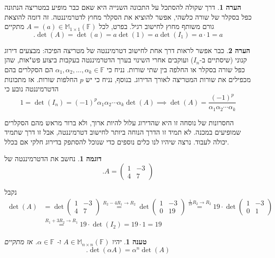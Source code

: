 \documentclass[12pt]{report}
\theoremstyle{plain}
\newtheorem{proposition}[theorem]{טענה}
\theoremstyle{definition}
\newtheorem{example}{דוגמה}[chapter]
\newtheorem{remark}{הערה}[chapter]
\newcommand{\F}{\mathbb{F}}
\newcommand{\M}{\mathbb{M}}
\newcommand{\0}{\mathbf{0}}
\begin{document}
\begin{remark}
דרך שקולה להסתכל על התכונה השנייה היא שאם כבר מופיע במטריצה הנתונה כפל בסקלר של שורה כלשהי,
אפשר להוציא את הסקלר מחוץ לדטרמיננטה. זה דומה להוצאת גורם משותף מחוץ לחישוב רגיל. בפרט, לכל
$A=(a)\in\M_{1\times 1}(\F)$
מתקיים
$$
.\det(A)=\det(a)=a\det(1)=a\det(I_1)=a\cdot1=a
$$
\end{remark}

\begin{remark}
כבר אפשר לראות דרך אחת לחישוב דטרמיננטה של מטריצה הפיכה: מבצעים דירוג קנוני (שיסתיים ב-$I_n$) ועוקבים אחרי השינוי בערך הדטרמיננטה בעקבות ביצוע פש"אות, שהן כפל שורה בסקלר או החלפה בין שתי שורות. נניח כי
$\alpha_1,\alpha_2,...,\alpha_k\in\F$
הם הסקלרים בהם מכפילים את שורות המטריצה לאורך הדירוג. בנוסף, נניח כי יש 
$p$
החלפות שורות. אז מתכונות הדטרמיננטה נובע כי
$$
1=\det(I_n)=(-1)^p\alpha_1\alpha_2\cdots\alpha_k\det(A) \implies \det(A)=\frac{(-1)^p}{\alpha_1\alpha_2\cdots\alpha_k}
$$

החסרונות של נוסחה זו היא שהדירוג עלול להיות ארוך, ולא ברור מראש מהם הסקלרים שמופיעים במכנה. לא תמיד זו הדרך הנוחה ביותר לחישוב דטרמיננטה, אבל זו דרך שתמיד יכולה לעבוד. נרצה שיהיו לנו כלים נוספים כדי שנוכל להסתפק בדירוג חלקי אם בכלל.

\end{remark}

\begin{example}
נחשב את הדטרמיננטה של
$$
.A=\begin{pmatrix}
1 & -3 \\
4 & 7
\end{pmatrix}
$$

נקבל
$$
\begin{aligned}
\det(A)&=\det\!\begin{pmatrix}
1 & -3 \\
4 & 7
\end{pmatrix}\overset{R_2 - 4R_1 \to R_2}{=}\det\!\begin{pmatrix}
1 & -3 \\
0 & 19
\end{pmatrix}\overset{\frac{1}{19}R_2 \to R_2}{=}19\cdot\det\!\begin{pmatrix}
1 & -3 \\
0 & 1
\end{pmatrix} \\
&\overset{R_1+3R_2\to R_1}{=}19\cdot\det(I_2)=19\cdot1=19
\end{aligned}
$$
\end{example}

\begin{proposition}\label{prop:det-scalar}
יהיו
$A\in\M_{n\times n}(\F)$
ו-
$\alpha\in\F$.
אז מתקיים
$$
.\det(\alpha A)=\alpha^n\det(A)
$$
\end{proposition}
\end{document}
